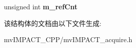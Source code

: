 \begin{DoxyCompactItemize}
\item 
\hypertarget{structmv_i_m_p_a_c_t_1_1acquire_1_1_i_o_sub_system_1_1_reference_counted_data_a72f4aa73d3fd01fd77bd969ee9b39296}{unsigned int {\bfseries m\+\_\+ref\+Cnt}}\label{structmv_i_m_p_a_c_t_1_1acquire_1_1_i_o_sub_system_1_1_reference_counted_data_a72f4aa73d3fd01fd77bd969ee9b39296}

\end{DoxyCompactItemize}


该结构体的文档由以下文件生成\+:\begin{DoxyCompactItemize}
\item 
mv\+I\+M\+P\+A\+C\+T\+\_\+\+C\+P\+P/mv\+I\+M\+P\+A\+C\+T\+\_\+acquire.\+h\end{DoxyCompactItemize}
